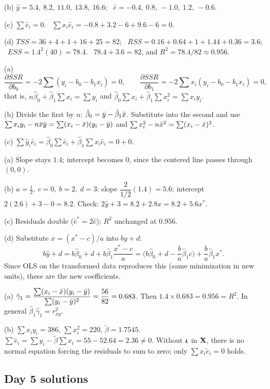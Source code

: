 \documentclass[11pt]{article}
\begin{document}
(b) $\hat y=5.4,\ 8.2,\ 11.0,\ 13.8,\ 16.6$; \ $\hat e=-0.4,\ 0.8,\ -1.0,\ 1.2,\ -0.6$.

(c) $\sum\hat e_i=0$. \ $\sum x_i\hat e_i=-0.8+3.2-6+9.6-6=0$.

(d) $TSS=36+4+1+16+25=82$; \ $RSS=0.16+0.64+1+1.44+0.36=3.6$; \ $ESS=1.4^2(40)=78.4$. \ $78.4+3.6=82$, and $R^2=78.4/82\approx0.956$.

(a)
\[ \frac{\partial SSR}{\partial b_0}=-2\sum(y_i-b_0-b_1x_i)=0, \qquad \frac{\partial SSR}{\partial b_1}=-2\sum x_i(y_i-b_0-b_1x_i)=0, \]
that is, $n\hat\beta_0+\hat\beta_1\sum x_i=\sum y_i$ and $\hat\beta_0\sum x_i+\hat\beta_1\sum x_i^2=\sum x_iy_i$.

(b) Divide the first by $n$: $\hat\beta_0=\bar{y}-\hat\beta_1\bar{x}$. Substitute into the second and use $\sum x_iy_i-n\bar{x}\bar{y}=\sum(x_i-\bar{x})(y_i-\bar{y})$ and $\sum x_i^2-n\bar{x}^2=\sum(x_i-\bar{x})^2$.

(c) $\sum\hat y_i\hat e_i=\hat\beta_0\sum\hat e_i+\hat\beta_1\sum x_i\hat e_i=0+0$.

(a) Slope stays $1.4$; intercept becomes $0$, since the centered line passes through $(0,0)$.

(b) $a=\tfrac12,\ c=0,\ b=2,\ d=3$: slope $\dfrac{2}{1/2}(1.4)=5.6$; intercept $2(2.6)+3-0=8.2$. Check: $2\hat y+3=8.2+2.8x=8.2+5.6x^*$.

(c) Residuals double ($\hat e^*=2\hat e$); $R^2$ unchanged at $0.956$.

(d) Substitute $x=(x^*-c)/a$ into $by+d$:
\[ b\hat y+d=b\hat\beta_0+d+b\hat\beta_1\frac{x^*-c}{a}=\Big(b\hat\beta_0+d-\frac{b}{a}\hat\beta_1c\Big)+\frac{b}{a}\hat\beta_1x^*. \]
Since OLS on the transformed data reproduces this (same minimization in new units), these are the new coefficients.

(a) $\hat\gamma_1=\dfrac{\sum(x_i-\bar{x})(y_i-\bar{y})}{\sum(y_i-\bar{y})^2}=\dfrac{56}{82}=0.683$. Then $1.4\times0.683=0.956=R^2$. In general $\hat\beta_1\hat\gamma_1=r_{xy}^2$.

(b) $\sum x_iy_i=386$, $\sum x_i^2=220$, $\tilde\beta=1.7545$. $\sum\tilde e_i=\sum y_i-\tilde\beta\sum x_i=55-52.64=2.36\neq0$. Without $\bm{\iota}$ in $\mathbf{X}$, there is no normal equation forcing the residuals to sum to zero; only $\sum x_i\tilde e_i=0$ holds.

\subsection{Day 5 solutions}
\end{document}
